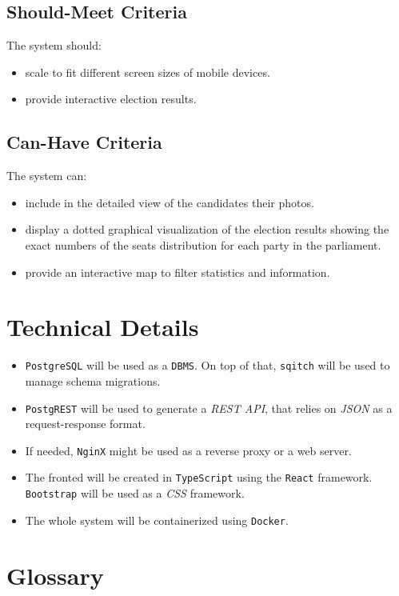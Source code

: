 \documentclass[a4paper]{article}
\begin{document}
\subsection{Should-Meet Criteria}
The system should:
\begin{itemize}
    \item scale to fit different screen sizes of mobile devices.
    \item provide interactive election results.
\end{itemize}

\subsection{Can-Have Criteria}
The system can:
\begin{itemize}
  \item include in the detailed view of the candidates their photos.
  \item display a dotted graphical visualization of the election results showing the exact numbers of the seats distribution for each party in the parliament.
  \item provide an interactive map to filter statistics and information.
\end{itemize}

\section{Technical Details}

\begin{itemize}
  \item \texttt{PostgreSQL} will be used as a \texttt{DBMS}. On top of that,
        \texttt{sqitch} will be used to manage schema migrations.
  \item \texttt{PostgREST} will be used to generate a \textit{REST API}, that
        relies on \textit{JSON} as a request-response format.
  \item If needed, \texttt{NginX} might be used as a reverse proxy or a web
        server.
  \item The fronted will be created in \texttt{TypeScript} using the
        \texttt{React} framework. \texttt{Bootstrap} will be used as a
        \textit{CSS} framework.
  \item The whole system will be containerized using \texttt{Docker}.

\end{itemize}

\section{Glossary}
\end{document}

